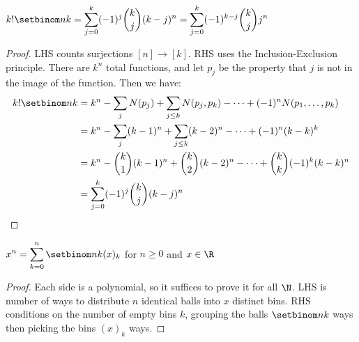 \documentclass[a4paper]{article}
\begin{document}
\begin{theorem}
$\displaystyle k!\setbinom nk
=\sum_{j=0}^k(-1)^j\binom kj(k-j)^n
=\sum_{j=0}^k(-1)^{k-j}\binom kjj^n$

\begin{hl}
\begin{proof}
LHS counts surjections $[n]\rightarrow[k]$. RHS uses the Inclusion-Exclusion principle. There are $k^n$ total functions, and let $p_j$ be the property that $j$ is not in the image of the function. Then we have:
\begin{align*}
k!\setbinom nk
&=k^n-\sum_jN(p_j)+\sum_{j\leq k}N(p_j,p_k)-\cdots+(-1)^nN(p_1,\dots,p_k)\\
&=k^n-\sum_j(k-1)^n+\sum_{j\leq k}(k-2)^n-\cdots+(-1)^n(k-k)^k\\
&=k^n-\binom k1(k-1)^n+\binom k2(k-2)^n-\cdots+\binom kk(-1)^k(k-k)^n\\
&=\sum_{j=0}^k(-1)^j\binom kj(k-j)^n\qedhere
\end{align*}
\end{proof}
\end{hl}
\end{theorem}

\begin{theorem}\label{monomial_as_falling}
$\displaystyle x^n=\sum_{k=0}^n\setbinom nk(x)_k$ for $n\geq0$ and $x\in\R$

\begin{hl}
\begin{proof}
Each side is a polynomial, so it suffices to prove it for all $\N$. LHS is number of ways to distribute $n$ identical balls into $x$ distinct bins. RHS conditions on the number of empty bins $k$, grouping the balls $\setbinom nk$ ways then picking the bins $(x)_k$ ways.
\end{proof}
\end{hl}
\end{theorem}
\end{document}
